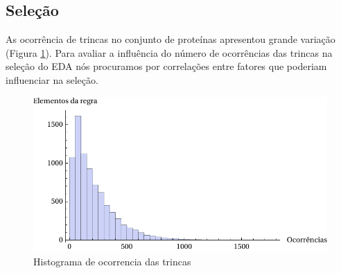 




\subsection{Seleção}

As ocorrência de trincas no conjunto de proteínas apresentou grande variação (Figura \ref{fig:histograma_occ}). Para avaliar a influência do número de ocorrências das trincas na seleção do EDA nós procuramos por correlações entre fatores que poderiam influenciar na seleção.

\begin{figure}
  \centering
  \includegraphics[width=1\textwidth]{figures/histograma_occ.pdf}
  \caption{Histograma de ocorrencia das trincas}
        \label{fig:histograma_occ}
\end{figure}

